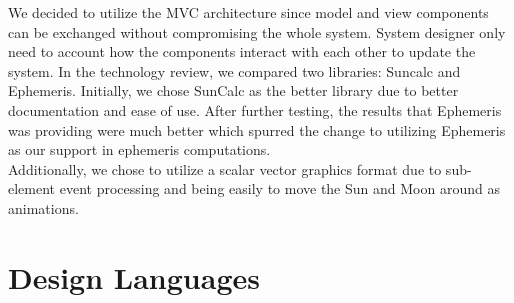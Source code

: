 \documentclass[10pt, onecolumn, draftclsnofoot, letterpaper, compsoc]{IEEEtran}
\begin{document}
We decided to utilize the MVC architecture since model and
view components can be exchanged without compromising the
whole system. System designer only need to account how the
components interact with each other to update the system.
In the technology review, we compared two libraries: Suncalc
and Ephemeris. Initially, we chose SunCalc as the better
library due to better documentation and ease of use. After
further testing, the results that Ephemeris was providing
were much better which spurred the change to utilizing
Ephemeris as our support in ephemeris computations. \\

Additionally, we chose to utilize a scalar vector graphics
format due to sub-element event processing and being easily
to move the Sun and Moon around as animations. \\

\section{Design Languages}


\newpage



\end{document}
